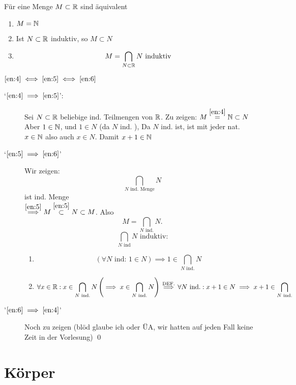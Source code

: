 \documentclass[consecutivenumbering]{gadsescript}
\begin{document}
\begin{subproposition}
	Für eine Menge $ M \subset \mathbb{R} $ sind äquivalent
	\begin{enumerate}[label=(\roman*)]
		\item \label{en:4}$ M = \mathbb{N} $
		\item \label{en:5}Ist $ N \subset \mathbb{R} $ induktiv, so $ M \subset N $
		\item \label{en:6}\[ M = \bigcap_{N\subset\mathbb{R}} N \text{ induktiv} \]
	\end{enumerate}

	$\ref{en:4} \iff \ref{en:5} \iff \ref{en:6}$
	\begin{subproof*}
		\begin{description}
			\item[`$\ref{en:4} \implies \ref{en:5}$':] Sei $ N \subset \mathbb{R} $ beliebige ind. Teilmengen von $\mathbb{R}$. Zu zeigen: $ M \overset{\ref{en:4}}{=} \mathbb{N} \subset N $\\
			Aber $ 1 \in \mathbb{N} $, und $ 1 \in N $ (da $ N $ ind. ), Da $ N $ ind. ist, ist mit jeder nat. $ x \in \mathbb{N} $ also auch $ x \in N $. Damit $ x + 1 \in \mathbb{N} $ 

		\item[`$\ref{en:5} \implies \ref{en:6}$'] Wir zeigen: \[\bigcap_{N \text{ ind. Menge}} N \] ist ind. Menge\\
			$\overset{\ref{en:5}}{\implies} M \overset{\ref{en:5}}{\subset} N \subset M $. Also \[ M = \bigcap_{N \text{ ind.}} N. \]
				\[\bigcap_{N \text{ ind}} N \text{ induktiv:}\]
				\begin{enumerate}[label=(\roman*)]
					\item \[ ( \forall N \text{ ind: } 1 \in N) \implies 1 \in \bigcap_{N \text{ ind.}} N \]
					\item \[ \forall x \in \mathbb{R} : x \in \bigcap_{ N \text{ ind.}} N \left( \implies x \in \bigcap_{N \text{ ind.}} N \right) \overset{\text{DEF.}}{\implies} \forall N \text{ ind.} : x + 1 \in N \implies x + 1 \in \bigcap_{N \text{ ind.}}\]
				\end{enumerate}
			\item['$\ref{en:6} \implies \ref{en:4}$'] Noch zu zeigen (blöd glaube ich oder ÜA, wir hatten auf jeden Fall keine Zeit in der Vorlesung) \qed
		\end{description}
	\end{subproof*}
\end{subproposition}

\section{Körper}
\end{document}
